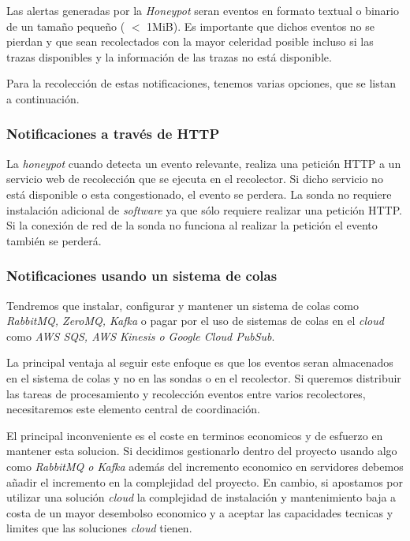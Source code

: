 Las alertas generadas por la \emph{Honeypot} seran eventos en formato textual o binario de un tamaño pequeño ( $<$ 1MiB). 
Es importante que dichos eventos no se pierdan y que sean recolectados con la mayor celeridad posible incluso si las trazas disponibles
y la información de las trazas no está disponible.

Para la recolección de estas notificaciones, tenemos varias opciones, que se listan a continuación.

\subsubsection{Notificaciones a través de HTTP}

La \emph{honeypot} cuando detecta un evento relevante, realiza una petición HTTP a un servicio web de recolección que se ejecuta en el recolector.
Si dicho servicio no está disponible o esta congestionado, el evento se perdera.
La sonda no requiere instalación adicional de \emph{software} ya que sólo requiere realizar una petición HTTP. 
Si la conexión de red de la sonda no funciona al realizar la petición el evento también se perderá.

\subsubsection{Notificaciones usando un sistema de colas}

Tendremos que instalar, configurar y mantener un sistema de colas como \emph{RabbitMQ, ZeroMQ, Kafka} 
o pagar por el uso de sistemas de colas en el \emph{cloud} como \emph{AWS SQS, AWS Kinesis o Google Cloud PubSub}.

La principal ventaja al seguir este enfoque es que los eventos seran almacenados en el sistema de colas y no en las sondas o en el recolector. Si queremos
distribuir las tareas de procesamiento y recolección eventos entre varios recolectores, necesitaremos este elemento central de coordinación.

El principal inconveniente es el coste en terminos economicos y de esfuerzo en mantener esta solucion. 
Si decidimos gestionarlo dentro del proyecto usando algo como \emph{RabbitMQ o Kafka} además del incremento economico en servidores 
debemos añadir el incremento en la complejidad del proyecto. En cambio, si apostamos por utilizar una solución \emph{cloud} la complejidad
de instalación y mantenimiento baja a costa de un mayor desembolso economico y a aceptar las capacidades tecnicas y limites que las soluciones 
\emph{cloud} tienen.

